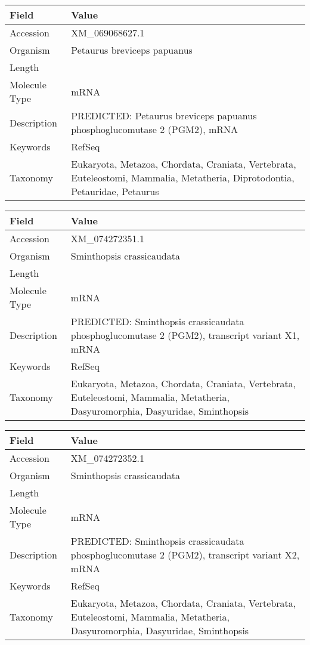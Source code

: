 \documentclass[10pt]{article}
\begin{document}
{\footnotesize
\begin{longtable}{>{\raggedright\arraybackslash}p{4.5cm} >{\raggedright\arraybackslash}p{11.5cm}}
\textbf{Field} & \textbf{Value} \\
\hline
Accession & XM\_069068627.1 \\
Organism & Petaurus breviceps papuanus \\
Length & 3377 \\
Molecule Type & mRNA \\
Description & PREDICTED: Petaurus breviceps papuanus phosphoglucomutase 2 (PGM2), mRNA \\
Keywords & RefSeq \\
Taxonomy & Eukaryota, Metazoa, Chordata, Craniata, Vertebrata, Euteleostomi, Mammalia, Metatheria, Diprotodontia, Petauridae, Petaurus \\
\end{longtable}
}

{\footnotesize
\begin{longtable}{>{\raggedright\arraybackslash}p{4.5cm} >{\raggedright\arraybackslash}p{11.5cm}}
\textbf{Field} & \textbf{Value} \\
\hline
Accession & XM\_074272351.1 \\
Organism & Sminthopsis crassicaudata \\
Length & 2785 \\
Molecule Type & mRNA \\
Description & PREDICTED: Sminthopsis crassicaudata phosphoglucomutase 2 (PGM2), transcript variant X1, mRNA \\
Keywords & RefSeq \\
Taxonomy & Eukaryota, Metazoa, Chordata, Craniata, Vertebrata, Euteleostomi, Mammalia, Metatheria, Dasyuromorphia, Dasyuridae, Sminthopsis \\
\end{longtable}
}

{\footnotesize
\begin{longtable}{>{\raggedright\arraybackslash}p{4.5cm} >{\raggedright\arraybackslash}p{11.5cm}}
\textbf{Field} & \textbf{Value} \\
\hline
Accession & XM\_074272352.1 \\
Organism & Sminthopsis crassicaudata \\
Length & 2591 \\
Molecule Type & mRNA \\
Description & PREDICTED: Sminthopsis crassicaudata phosphoglucomutase 2 (PGM2), transcript variant X2, mRNA \\
Keywords & RefSeq \\
Taxonomy & Eukaryota, Metazoa, Chordata, Craniata, Vertebrata, Euteleostomi, Mammalia, Metatheria, Dasyuromorphia, Dasyuridae, Sminthopsis \\
\end{longtable}
}
\end{document}
